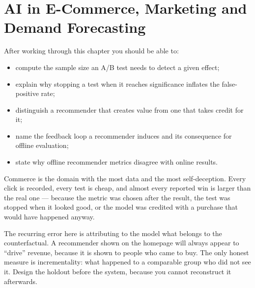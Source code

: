 
\chapter{AI in E-Commerce, Marketing and Demand Forecasting}


\label{ch:ecommerce-marketing}

\begin{learningobjectives}
After working through this chapter you should be able to:
\begin{itemize}
  \item compute the sample size an A/B test needs to detect a given effect;
  \item explain why stopping a test when it reaches significance inflates the
        false-positive rate;
  \item distinguish a recommender that creates value from one that takes credit
        for it;
  \item name the feedback loop a recommender induces and its consequence for
        offline evaluation;
  \item state why offline recommender metrics disagree with online results.
\end{itemize}
\end{learningobjectives}

\begin{plainlanguage}
Commerce is the domain with the most data and the most self-deception. Every
click is recorded, every test is cheap, and almost every reported win is larger
than the real one --- because the metric was chosen after the result, the test
was stopped when it looked good, or the model was credited with a purchase that
would have happened anyway.
\end{plainlanguage}

\begin{engineernote}
The recurring error here is attributing to the model what belongs to the
counterfactual. A recommender shown on the homepage will always appear to
``drive'' revenue, because it is shown to people who came to buy. The only
honest measure is incrementality: what happened to a comparable group who did
not see it. Design the holdout before the system, because you cannot
reconstruct it afterwards.
\end{engineernote}

